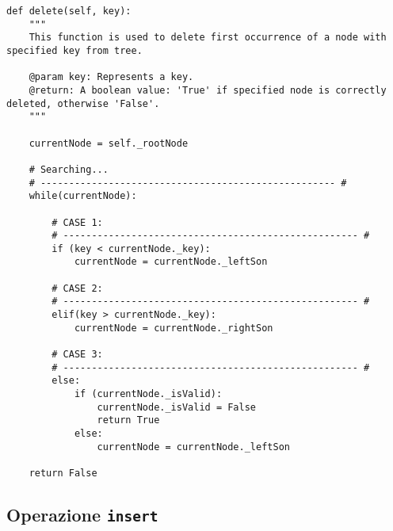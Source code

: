 \documentclass[10pt,a4paper,titlepage]{article}
\begin{document}
\begin{lstlisting}[frame=lines]
def delete(self, key):
    """
    This function is used to delete first occurrence of a node with specified key from tree.
        
    @param key: Represents a key. 
    @return: A boolean value: 'True' if specified node is correctly deleted, otherwise 'False'.
    """
        
    currentNode = self._rootNode
              
    # Searching...
    # ---------------------------------------------------- #
    while(currentNode):
                
        # CASE 1:
        # ---------------------------------------------------- #
        if (key < currentNode._key):                              
            currentNode = currentNode._leftSon         
            
        # CASE 2:
        # ---------------------------------------------------- #
        elif(key > currentNode._key):           
            currentNode = currentNode._rightSon  
              
        # CASE 3:
        # ---------------------------------------------------- #
        else:  
            if (currentNode._isValid):
                currentNode._isValid = False
                return True
            else:
                currentNode = currentNode._leftSon
                        
    return False
\end{lstlisting}

\subsection{Operazione \texttt{insert}}
\end{document}
